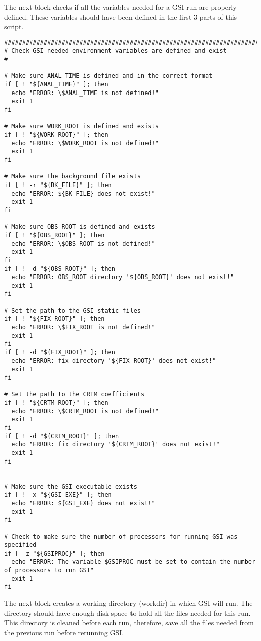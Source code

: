 The next block checks if all the variables needed for a GSI run are properly defined. These variables should have been defined in the first 3 parts of this script. 

\begin{scriptsize}
\begin{verbatim}
##################################################################################
# Check GSI needed environment variables are defined and exist
#

# Make sure ANAL_TIME is defined and in the correct format
if [ ! "${ANAL_TIME}" ]; then
  echo "ERROR: \$ANAL_TIME is not defined!"
  exit 1
fi

# Make sure WORK_ROOT is defined and exists
if [ ! "${WORK_ROOT}" ]; then
  echo "ERROR: \$WORK_ROOT is not defined!"
  exit 1
fi

# Make sure the background file exists
if [ ! -r "${BK_FILE}" ]; then
  echo "ERROR: ${BK_FILE} does not exist!"
  exit 1
fi

# Make sure OBS_ROOT is defined and exists
if [ ! "${OBS_ROOT}" ]; then
  echo "ERROR: \$OBS_ROOT is not defined!"
  exit 1
fi
if [ ! -d "${OBS_ROOT}" ]; then
  echo "ERROR: OBS_ROOT directory '${OBS_ROOT}' does not exist!"
  exit 1
fi

# Set the path to the GSI static files
if [ ! "${FIX_ROOT}" ]; then
  echo "ERROR: \$FIX_ROOT is not defined!"
  exit 1
fi
if [ ! -d "${FIX_ROOT}" ]; then
  echo "ERROR: fix directory '${FIX_ROOT}' does not exist!"
  exit 1
fi

# Set the path to the CRTM coefficients
if [ ! "${CRTM_ROOT}" ]; then
  echo "ERROR: \$CRTM_ROOT is not defined!"
  exit 1
fi
if [ ! -d "${CRTM_ROOT}" ]; then
  echo "ERROR: fix directory '${CRTM_ROOT}' does not exist!"
  exit 1
fi


# Make sure the GSI executable exists
if [ ! -x "${GSI_EXE}" ]; then
  echo "ERROR: ${GSI_EXE} does not exist!"
  exit 1
fi

# Check to make sure the number of processors for running GSI was specified
if [ -z "${GSIPROC}" ]; then
  echo "ERROR: The variable $GSIPROC must be set to contain the number of processors to run GSI"
  exit 1
fi

\end{verbatim}
\end{scriptsize}

The next block creates a working directory (workdir) in which GSI will run. The directory should have enough disk space to hold all the files needed for this run. This directory is cleaned before each run, therefore, save all the files needed from the previous run before rerunning GSI.

